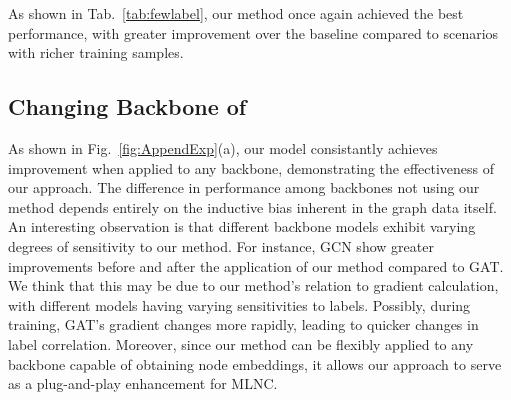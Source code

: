 As shown in Tab.~\ref{tab:fewlabel}, our method once again achieved the best performance, with greater improvement over the baseline compared to scenarios with richer training samples.



\subsection{Changing Backbone of \model}

As shown in Fig.~\ref{fig:AppendExp}(a), our model consistantly achieves improvement when applied to any backbone, demonstrating the effectiveness of our approach. The difference in performance among backbones not using our method depends entirely on the inductive bias inherent in the graph data itself. An interesting observation is that different backbone models exhibit varying degrees of sensitivity to our method. For instance, GCN show greater improvements before and after the application of our method compared to GAT. We think that this may be due to our method's relation to gradient calculation, with different models having varying sensitivities to labels. Possibly, during training, GAT's gradient changes more rapidly, leading to quicker changes in label correlation. Moreover, since our method can be flexibly applied to any backbone capable of obtaining node embeddings, it allows our approach to serve as a plug-and-play enhancement for MLNC.

\begin{table}[!ht]
    \centering
    \caption{Changing backbones (AUC) under node split on MLNC datasets.}
    \label{BackbonesApp}
\end{table}

